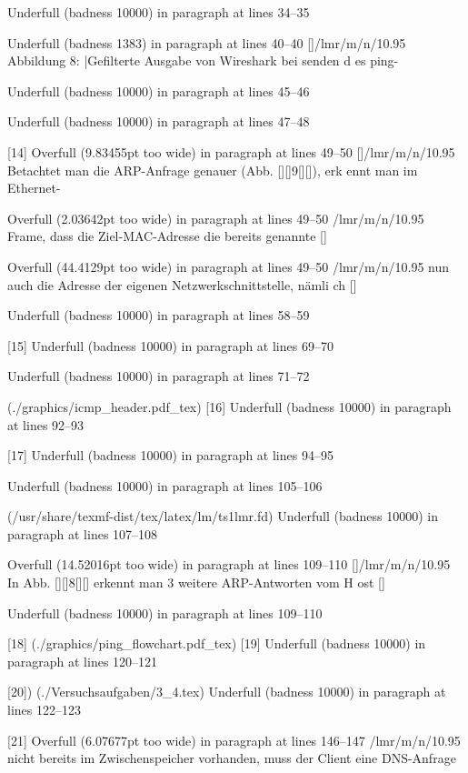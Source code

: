Underfull \hbox (badness 10000) in paragraph at lines 34--35


Underfull \hbox (badness 1383) in paragraph at lines 40--40
[]\TU/lmr/m/n/10.95 Abbildung 8: |Gefilterte Ausgabe von Wireshark bei senden d
es ping-

Underfull \hbox (badness 10000) in paragraph at lines 45--46


Underfull \hbox (badness 10000) in paragraph at lines 47--48

[14]
Overfull \hbox (9.83455pt too wide) in paragraph at lines 49--50
[]\TU/lmr/m/n/10.95 Betachtet man die ARP-Anfrage genauer (Abb. [][]9[][]), erk
ennt man im Ethernet-

Overfull \hbox (2.03642pt too wide) in paragraph at lines 49--50
\TU/lmr/m/n/10.95 Frame, dass die Ziel-MAC-Adresse die bereits genannte  []

Overfull \hbox (44.4129pt too wide) in paragraph at lines 49--50
\TU/lmr/m/n/10.95 nun auch die Adresse der eigenen Netzwerkschnittstelle, nämli
ch  []

Underfull \hbox (badness 10000) in paragraph at lines 58--59

[15]
Underfull \hbox (badness 10000) in paragraph at lines 69--70


Underfull \hbox (badness 10000) in paragraph at lines 71--72

(./graphics/icmp_header.pdf_tex) [16]
Underfull \hbox (badness 10000) in paragraph at lines 92--93

[17]
Underfull \hbox (badness 10000) in paragraph at lines 94--95


Underfull \hbox (badness 10000) in paragraph at lines 105--106

(/usr/share/texmf-dist/tex/latex/lm/ts1lmr.fd)
Underfull \hbox (badness 10000) in paragraph at lines 107--108


Overfull \hbox (14.52016pt too wide) in paragraph at lines 109--110
[]\TU/lmr/m/n/10.95 In Abb. [][]8[][] erkennt man 3 weitere ARP-Antworten vom H
ost  []

Underfull \hbox (badness 10000) in paragraph at lines 109--110

[18] (./graphics/ping_flowchart.pdf_tex) [19]
Underfull \hbox (badness 10000) in paragraph at lines 120--121

[20]) (./Versuchsaufgaben/3_4.tex)
Underfull \hbox (badness 10000) in paragraph at lines 122--123

[21]
Overfull \hbox (6.07677pt too wide) in paragraph at lines 146--147
\TU/lmr/m/n/10.95 nicht bereits im Zwischenspeicher vorhanden, muss der Client 
eine DNS-Anfrage

